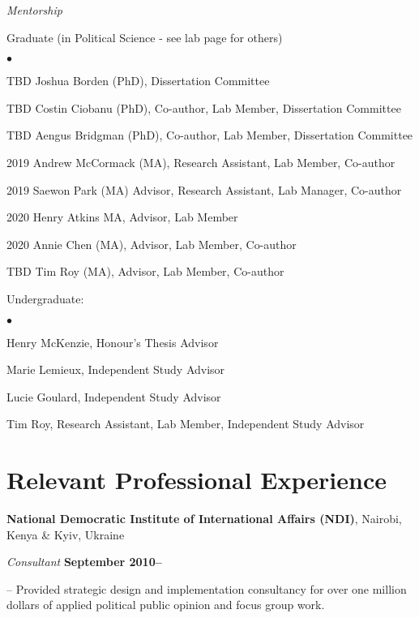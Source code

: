 \documentclass[margin,line]{res}
\newenvironment{list1}{
  \begin{list}{\ding{113}}{%
      \setlength{\itemsep}{0in}
      \setlength{\parsep}{0in} \setlength{\parskip}{0in}
      \setlength{\topsep}{0in} \setlength{\partopsep}{0in} 
      \setlength{\leftmargin}{0.17in}}}{\end{list}}
\newenvironment{list2}{
  \begin{list}{$\bullet$}{%
      \setlength{\itemsep}{0in}
      \setlength{\parsep}{0in} \setlength{\parskip}{0in}
      \setlength{\topsep}{0in} \setlength{\partopsep}{0in} 
      \setlength{\leftmargin}{0.2in}}}{\end{list}}
\begin{document}
{\begin{resume}
\textbf{}
{\em Mentorship}\\
\vspace{-.1in}
\begin{list1}
\item[] Graduate (in Political Science - see lab page for others)
  \begin{list2}
  \item[TBD] Joshua Borden (PhD), Dissertation Committee
  \item[TBD] Costin Ciobanu (PhD), Co-author, Lab Member, Dissertation Committee
  \item[TBD] Aengus Bridgman (PhD), Co-author, Lab Member, Dissertation Committee
   \item[2019] Andrew McCormack (MA), Research Assistant, Lab Member, Co-author
   \item[2019] Saewon Park (MA) Advisor, Research Assistant, Lab Manager, Co-author
   \item[2020] Henry Atkins MA, Advisor, Lab Member
   \item[2020] Annie Chen (MA), Advisor, Lab Member, Co-author
   \item[TBD] Tim Roy (MA), Advisor, Lab Member, Co-author


     
\end{list2}

 \item[] Undergraduate:
   \begin{list2}
   \item[] Henry McKenzie, Honour's Thesis Advisor
   \item[] Marie Lemieux, Independent Study Advisor
    \item[] Lucie Goulard, Independent Study Advisor
   \item[] Tim Roy, Research Assistant, Lab Member, Independent Study Advisor
\end{list2}
\end{list1}

\section{\sc Relevant Professional Experience}
{\bf National Democratic Institute of International Affairs (NDI)},
Nairobi, Kenya \& Kyiv, Ukraine

\vspace{-.3cm}
{\em Consultant} \hfill {\bf
  September 2010--}\\
\begin{list1}
\item[]-- Provided strategic design and implementation consultancy
  for over one million dollars of applied
political public opinion and focus group work.
\end{list1}


\end{resume}}
\end{document}
